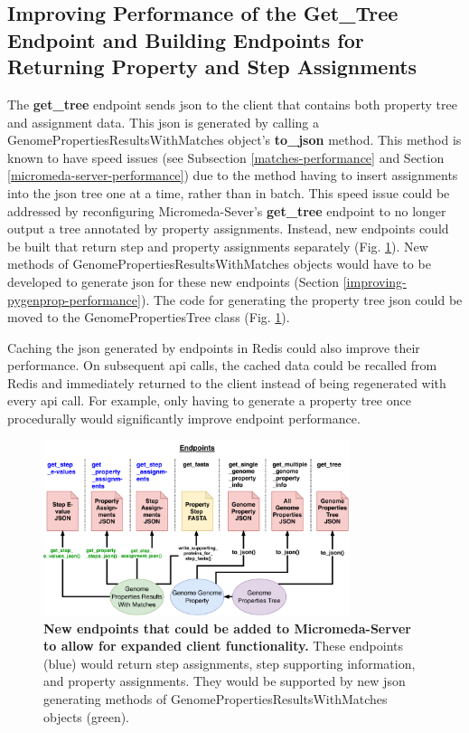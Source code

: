 \subsection{Improving Performance of the Get\_Tree Endpoint and Building 
Endpoints for Returning Property and Step Assignments} 
\label{assignment-endpoints}

The \textbf{get\_tree} endpoint sends \gls{json} to the client that contains 
both property tree and assignment data. This \gls{json} is generated by calling 
a GenomePropertiesResultsWithMatches object's \textbf{to\_json} method. This 
method is known to have speed issues (see Subsection \ref{matches-performance} 
and Section \ref{micromeda-server-performance}) due to the method having to 
insert assignments into the \gls{json} tree one at a time, rather than in batch. 
This speed issue could be addressed by reconfiguring Micromeda-Sever's 
\textbf{get\_tree} endpoint to no longer output a tree annotated by property 
assignments. Instead, new endpoints could be built that return step and property 
assignments separately (Fig. \ref{fig:new_endpoints}). New methods of 
GenomePropertiesResultsWithMatches objects would have to be developed to 
generate \gls{json} for these new endpoints (Section 
\ref{improving-pygenprop-performance}). The code for generating the property 
tree \gls{json} could be moved to the GenomePropertiesTree class (Fig. 
\ref{fig:new_endpoints}).

Caching the \gls{json} generated by endpoints in Redis could also improve their 
performance. On subsequent \gls{api} calls, the cached data could be recalled 
from Redis and immediately returned to the client instead of being regenerated 
with every \gls{api} call. For example, only having to generate a property tree 
once procedurally would significantly improve endpoint performance.

\begin{figure}[!ht]
  \centering
	\includegraphics[width=0.8\textwidth]{media/micromeda-server-new-endpoints.pdf}
	 \caption[New endpoints that could be added to Micromeda-Server to allow for 
expanded client functionality.]{\textbf{New endpoints that could be added to 
Micromeda-Server to allow for expanded client functionality.} These endpoints 
(blue) would return step assignments, step supporting information, and property 
assignments. They would be supported by new \gls{json} generating methods of 
GenomePropertiesResultsWithMatches objects (green).}
	 \label{fig:new_endpoints}
\end{figure}

